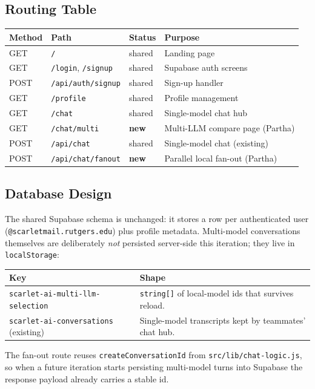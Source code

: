 \documentclass[11pt]{article}
\begin{document}
\subsection{Routing Table}

\begin{tabularx}{\textwidth}{lllX}
\toprule
\textbf{Method} & \textbf{Path} & \textbf{Status} & \textbf{Purpose} \\
\midrule
GET  & \texttt{/} & shared & Landing page \\
GET  & \texttt{/login}, \texttt{/signup} & shared & Supabase auth screens \\
POST & \texttt{/api/auth/signup} & shared & Sign-up handler \\
GET  & \texttt{/profile} & shared & Profile management \\
GET  & \texttt{/chat} & shared & Single-model chat hub \\
GET  & \texttt{/chat/multi} & \textbf{new} & Multi-LLM compare page (Partha) \\
POST & \texttt{/api/chat} & shared & Single-model chat (existing) \\
POST & \texttt{/api/chat/fanout} & \textbf{new} & Parallel local fan-out (Partha) \\
\bottomrule
\end{tabularx}

\subsection{Database Design}

The shared Supabase schema is unchanged: it stores a row per
authenticated user (\texttt{@scarletmail.rutgers.edu}) plus profile
metadata.  Multi-model conversations themselves are deliberately
\emph{not} persisted server-side this iteration; they live in
\texttt{localStorage}:

\begin{tabularx}{\textwidth}{lX}
\toprule
\textbf{Key} & \textbf{Shape} \\
\midrule
\texttt{scarlet-ai-multi-llm-selection} &
\texttt{string[]} of local-model ids that survives reload. \\
\texttt{scarlet-ai-conversations} (existing) &
Single-model transcripts kept by teammates' chat hub. \\
\bottomrule
\end{tabularx}

The fan-out route reuses
\texttt{createConversationId} from \texttt{src/lib/chat-logic.js},
so when a future iteration starts persisting multi-model turns into
Supabase the response payload already carries a stable id.
\end{document}
